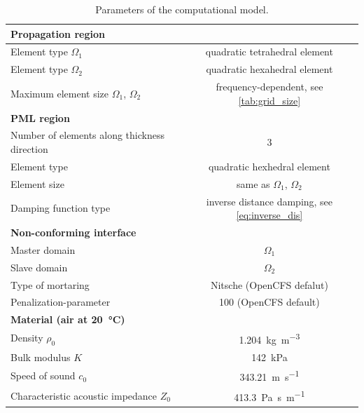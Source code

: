 \begin{table}
	\centering
	\caption{Parameters of the computational model.}
	\label{tab:model_parameters}
	\begin{tabular}{lc}
		\toprule
		\textbf{Propagation region} & \\
        \midrule
		Element type $\Omega_1$ & quadratic tetrahedral element \\
		Element type $\Omega_2$ & quadratic hexahedral element \\
		Maximum element size $\Omega_1$, $\Omega_2$ & frequency-dependent, see \cref{tab:grid_size}\\
  \midrule
		\textbf{PML region} & \\
        \midrule
		Number of elements along thickness direction & 3 \\
		Element type & quadratic hexhedral element \\
		Element size & same as $\Omega_1$, $\Omega_2$\\
		Damping function type & inverse distance damping, see \cref{eq:inverse_dis} \\
    \midrule
		\textbf{Non-conforming interface} & \\
          \midrule
		Master domain & $\Omega_1$ \\
		Slave domain & $\Omega_2$ \\
		Type of mortaring & Nitsche (OpenCFS defalut) \\
		Penalization-parameter & 100 (OpenCFS default) \\
    \midrule
		\textbf{Material (air at \SI{20}{\degreeCelsius})} & \\
          \midrule
		Density $\rho_0$ & \SI{1.204}{\kilogram\per\cubic\meter} \\
		Bulk modulus $K$ & \SI{142}{\kilo\pascal} \\
		Speed of sound $c_0$ & \SI{343.21}{\meter\per\second} \\
		Characteristic acoustic impedance $Z_0$ & \SI{413.3}{\pascal\second\per\meter}  \\
		\bottomrule
	\end{tabular}
\end{table}

